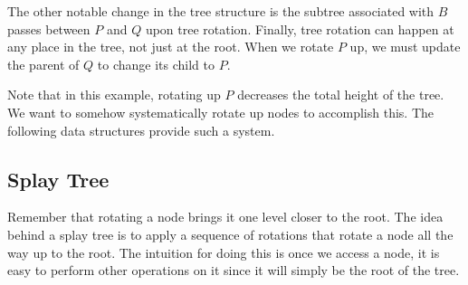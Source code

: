The other notable change in the tree structure is the subtree associated with $B$ passes between $P$ and $Q$ upon tree rotation. Finally, tree rotation can happen at any place in the tree, not just at the root. When we rotate $P$ up, we must update the parent of $Q$ to change its child to $P$.

\begin{center}
\end{center}

Note that in this example, rotating up $P$ decreases the total height of the tree. We want to somehow systematically rotate up nodes to accomplish this. The following data structures provide such a system.

\subsection{Splay Tree}

Remember that rotating a node brings it one level closer to the root. The idea behind a splay tree is to apply a sequence of rotations that rotate a node all the way up to the root. The intuition for doing this is once we access a node, it is easy to perform other operations on it since it will simply be the root of the tree.

